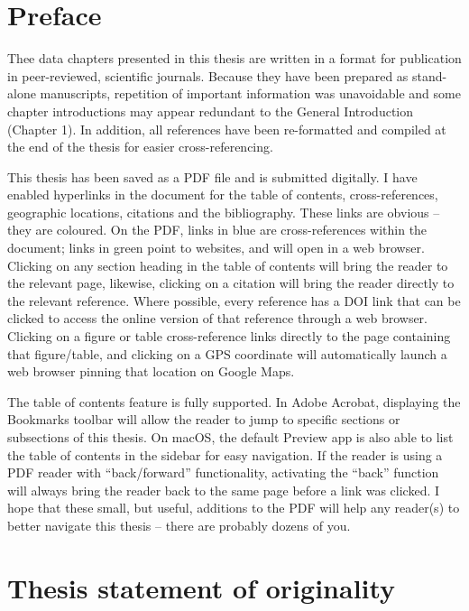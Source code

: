 \documentclass[a4paper,10pt, oneside]{memoir}
\begin{document}
\hypertarget{preface}{%
\chapter*{Preface}\label{preface}}

Thee data chapters presented in this thesis are written in a format for publication in peer-reviewed, scientific journals.
Because they have been prepared as stand-alone manuscripts, repetition of important information was unavoidable and some chapter introductions may appear redundant to the General Introduction (Chapter 1).
In addition, all references have been re-formatted and compiled at the end of the thesis for easier cross-referencing.

This thesis has been saved as a PDF file and is submitted digitally. I have enabled hyperlinks in the document for the table of contents, cross-references, geographic locations, citations and the bibliography.
These links are obvious -- they are coloured. On the PDF, links in \textcolor{cobalt}{blue} are cross-references within the document; links in \textcolor{cadmiumgreen}{green} point to websites, and will open in a web browser.
Clicking on any section heading in the table of contents will bring the reader to the relevant page, likewise, clicking on a citation will bring the reader directly to the relevant reference.
Where possible, every reference has a DOI link that can be clicked to access the online version of that reference through a web browser.
Clicking on a figure or table cross-reference links directly to the page containing that figure/table, and clicking on a GPS coordinate will automatically launch a web browser pinning that location on Google Maps.

The table of contents feature is fully supported. In Adobe Acrobat, displaying the Bookmarks toolbar will allow the reader to jump to specific sections or subsections of this thesis. On macOS, the default Preview app is also able to list the table of contents in the sidebar for easy navigation. If the reader is using a PDF reader with ``back/forward'' functionality, activating the ``back'' function will always bring the reader back to the same page before a link was clicked.
I hope that these small, but useful, additions to the PDF will help any reader(s) to better navigate this thesis -- there are probably dozens of you.

\cleardoublepage

\hypertarget{thesis-statement-of-originality}{%
\chapter*{Thesis statement of originality}\label{thesis-statement-of-originality}}
\end{document}
